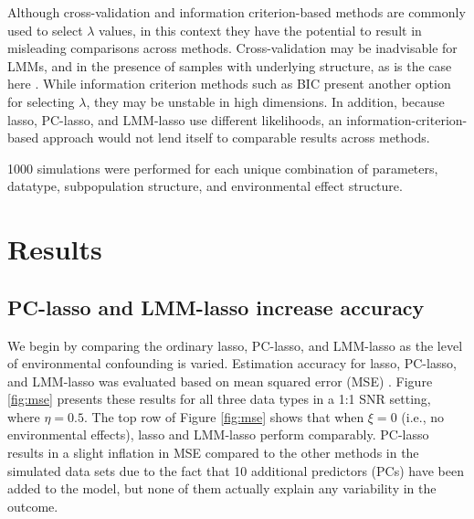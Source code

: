 Although cross-validation and information criterion-based methods are commonly used to select $\lambda$ values, in this context they have the potential to result in misleading comparisons across methods. Cross-validation may be inadvisable for LMMs, and in the presence of samples with underlying structure, as is the case here \citep{roberts2017cross}. While information criterion methods such as BIC present another option for selecting $\lambda$, they may be unstable in high dimensions. In addition, because lasso, PC-lasso, and LMM-lasso use different likelihoods, an information-criterion-based approach would not lend itself to comparable results across methods. 

1000 simulations were performed for each unique combination of parameters, datatype, subpopulation structure, and environmental effect structure. 


\section{Results} \label{sec:results}

\subsection{PC-lasso and LMM-lasso increase accuracy}
\label{sec:sim-mse}

We begin by comparing the ordinary lasso, PC-lasso, and LMM-lasso as the level of environmental confounding is varied. Estimation accuracy for lasso, PC-lasso, and LMM-lasso was evaluated based on mean squared error (MSE) . Figure \ref{fig:mse} presents these results for all three data types in a 1:1 SNR setting, where $\eta = 0.5$. The top row of Figure \ref{fig:mse} shows that when $\xi = 0$ (i.e., no environmental effects), lasso and LMM-lasso perform comparably. PC-lasso results in a slight inflation in MSE compared to the other methods in the simulated data sets due to the fact that 10 additional predictors (PCs) have been added to the model, but none of them actually explain any variability in the outcome. 

